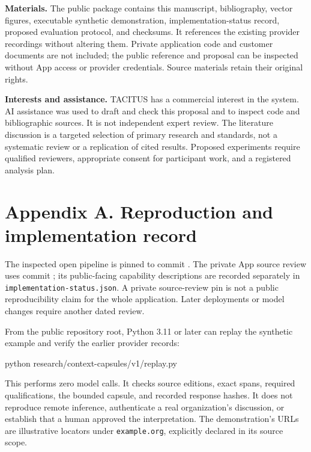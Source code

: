 \documentclass[
  11pt,
]{article}
\newenvironment{Shaded}{}{}
\newcommand{\ExtensionTok}[1]{#1}
\newcommand{\NormalTok}[1]{#1}
\let\originalsection\section
\renewcommand{\section}{\Needspace{5\baselineskip}\originalsection}
\begin{document}
\textbf{Materials.} The public package contains this manuscript,
bibliography, vector figures, executable synthetic demonstration,
implementation-status record, proposed evaluation protocol, and
checksums. It references the existing provider recordings without
altering them. Private application code and customer documents are not
included; the public reference and proposal can be inspected without App
access or provider credentials. Source materials retain their original
rights.

\textbf{Interests and assistance.} TACITUS has a commercial interest in
the system. AI assistance was used to draft and check this proposal and
to inspect code and bibliographic sources. It is not independent expert
review. The literature discussion is a targeted selection of primary
research and standards, not a systematic review or a replication of
cited results. Proposed experiments require qualified reviewers,
appropriate consent for participant work, and a registered analysis
plan.

\section*{Appendix A. Reproduction and implementation
record}\label{appendix-a.-reproduction-and-implementation-record}

The inspected open pipeline is pinned to commit
\texttt{}. The
private App source review uses commit
\texttt{}; its
public-facing capability descriptions are recorded separately in
\texttt{implementation-status.json}. A private source-review pin is not
a public reproducibility claim for the whole application. Later
deployments or model changes require another dated review.

From the public repository root, Python 3.11 or later can replay the
synthetic example and verify the earlier provider records:

\begin{Shaded}
\begin{Highlighting}[]
\ExtensionTok{python}\NormalTok{ research/context{-}capsules/v1/replay.py}
\end{Highlighting}
\end{Shaded}

This performs zero model calls. It checks source editions, exact spans,
required qualifications, the bounded capsule, and recorded response
hashes. It does not reproduce remote inference, authenticate a real
organization's discussion, or establish that a human approved the
interpretation. The demonstration's URLs are illustrative locators under
\texttt{example.org}, explicitly declared in its source scope.
\end{document}
